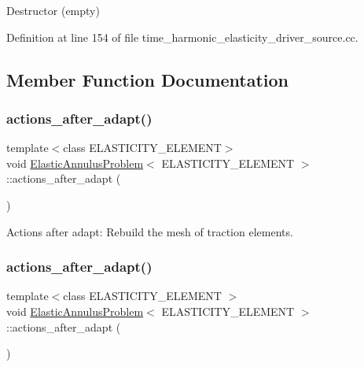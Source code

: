 Destructor (empty) 



Definition at line 154 of file time\+\_\+harmonic\+\_\+elasticity\+\_\+driver\+\_\+source.\+cc.



\subsection{Member Function Documentation}
\mbox{\label{classElasticAnnulusProblem_aa47beeedeac662b19c0f992daf77ef25}} 
\subsubsection{\texorpdfstring{actions\+\_\+after\+\_\+adapt()}{actions\_after\_adapt()}\hspace{0.1cm}{\footnotesize\ttfamily [1/2]}}
{\footnotesize\ttfamily template$<$class E\+L\+A\+S\+T\+I\+C\+I\+T\+Y\+\_\+\+E\+L\+E\+M\+E\+NT$>$ \\
void \hyperlink{classElasticAnnulusProblem}{Elastic\+Annulus\+Problem}$<$ E\+L\+A\+S\+T\+I\+C\+I\+T\+Y\+\_\+\+E\+L\+E\+M\+E\+NT $>$\+::actions\+\_\+after\+\_\+adapt (\begin{DoxyParamCaption}{ }\end{DoxyParamCaption})}



Actions after adapt\+: Rebuild the mesh of traction elements. 

\mbox{\label{classElasticAnnulusProblem_aa47beeedeac662b19c0f992daf77ef25}} 
\subsubsection{\texorpdfstring{actions\+\_\+after\+\_\+adapt()}{actions\_after\_adapt()}\hspace{0.1cm}{\footnotesize\ttfamily [2/2]}}
{\footnotesize\ttfamily template$<$class E\+L\+A\+S\+T\+I\+C\+I\+T\+Y\+\_\+\+E\+L\+E\+M\+E\+NT $>$ \\
void \hyperlink{classElasticAnnulusProblem}{Elastic\+Annulus\+Problem}$<$ E\+L\+A\+S\+T\+I\+C\+I\+T\+Y\+\_\+\+E\+L\+E\+M\+E\+NT $>$\+::actions\+\_\+after\+\_\+adapt (\begin{DoxyParamCaption}{ }\end{DoxyParamCaption})}



